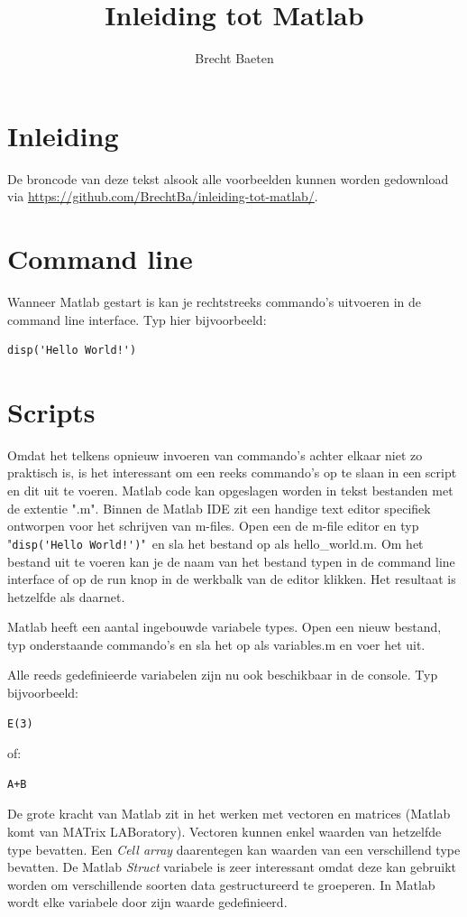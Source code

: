 \documentclass[11pt,twoside]{article}
\title{Inleiding tot Matlab}
\author{Brecht Baeten}
\begin{document}
	\maketitle

	\section{Inleiding}
De broncode van deze tekst alsook alle voorbeelden kunnen worden gedownload via \url{https://github.com/BrechtBa/inleiding-tot-matlab/}.

	\section{Command line}
Wanneer Matlab gestart is kan je rechtstreeks commando's uitvoeren in de command line interface. Typ hier bijvoorbeeld:
\begin{lstlisting}
disp('Hello World!')
\end{lstlisting}

 	\section{Scripts}
Omdat het telkens opnieuw invoeren van commando's achter elkaar niet zo praktisch is, is het interessant om een reeks commando's op te slaan in een script en dit uit te voeren. Matlab code kan opgeslagen worden in tekst bestanden met de extentie "\textsf{.m}". Binnen de Matlab IDE zit een handige text editor specifiek ontworpen voor het schrijven van m-files. Open een de m-file editor en typ "\lstinline{disp('Hello World!')}"\ en sla het bestand op als \textsf{hello\_world.m}. Om het bestand uit te voeren kan je de naam van het bestand typen in de command line interface of op de \textsf{run} knop in de werkbalk van de editor klikken. Het resultaat is hetzelfde als daarnet.

Matlab heeft een aantal ingebouwde variabele types. Open een nieuw bestand, typ onderstaande commando's en sla het op als \textsf{variables.m} en voer het uit.


Alle reeds gedefinieerde variabelen zijn nu ook beschikbaar in de console. Typ bijvoorbeeld:
\begin{lstlisting}
E(3)
\end{lstlisting}
of:
\begin{lstlisting}
A+B
\end{lstlisting}

De grote kracht van Matlab zit in het werken met vectoren en matrices (Matlab komt van MATrix LABoratory). Vectoren kunnen enkel waarden van hetzelfde type bevatten. Een \emph{Cell array} daarentegen kan waarden van een verschillend type bevatten. De Matlab \emph{Struct} variabele is zeer interessant omdat deze kan gebruikt worden om verschillende soorten data gestructureerd te groeperen. In Matlab wordt elke variabele door zijn waarde gedefinieerd.
\end{document}
